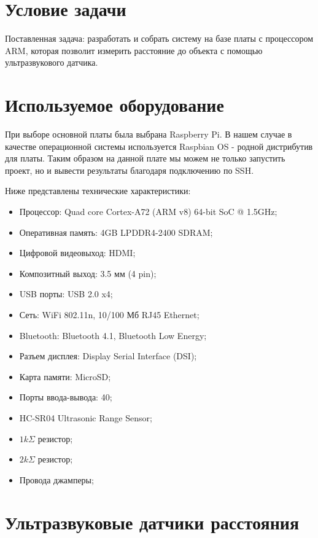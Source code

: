 \documentclass[a4paper, 14pt]{article}
\begin{document}
\Large
\tableofcontents
\newpage

\section{Условие задачи}

Поставленная задача: разработать и собрать систему на базе платы с процессором ARM, которая позволит измерить расстояние до объекта с помощью ультразвукового датчика.

\newpage
\section{Используемое оборудование}

При выборе основной платы была выбрана Raspberry Pi. В нашем случае в качестве операционной системы используется Raspbian OS - родной дистрибутив для платы. Таким образом на данной плате мы можем не только запустить проект, но и вывести результаты благодаря подключению по SSH.

Ниже представлены технические характеристики:

\begin{itemize}
	\item Процессор: Quad core Cortex-A72 (ARM v8) 64-bit SoC @ 1.5GHz;
	\item Оперативная память: 4GB LPDDR4-2400 SDRAM;
	\item Цифровой видеовыход: HDMI;
	\item Композитный выход: 3.5 мм (4 pin);
	\item USB порты: USB 2.0 x4;
	\item Сеть: WiFi 802.11n, 10/100 Мб RJ45 Ethernet;
	\item Bluetooth: Bluetooth 4.1, Bluetooth Low Energy;
	\item Разъем дисплея: Display Serial Interface (DSI);
	\item Карта памяти: MicroSD;
	\item Порты ввода-вывода: 40;
	\item HC-SR04 Ultrasonic Range Sensor;
	\item $1k\Sigma$ резистор;
	\item $2k\Sigma$ резистор;
	\item Провода джамперы;
\end{itemize}

\newpage
\section{Ультразвуковые датчики расстояния}
\end{document}
